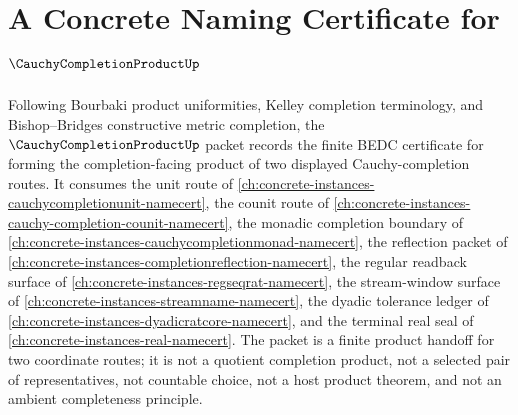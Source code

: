\chapter{A Concrete Naming Certificate for $\CauchyCompletionProductUp$}
\label{ch:concrete-instances-cauchy-completion-product-namecert}

Following Bourbaki product uniformities, Kelley completion terminology, and Bishop--Bridges constructive metric completion, the $\CauchyCompletionProductUp$ packet records the finite BEDC certificate for forming the completion-facing product of two displayed Cauchy-completion routes. It consumes the unit route of \autoref{ch:concrete-instances-cauchycompletionunit-namecert}, the counit route of \autoref{ch:concrete-instances-cauchy-completion-counit-namecert}, the monadic completion boundary of \autoref{ch:concrete-instances-cauchycompletionmonad-namecert}, the reflection packet of \autoref{ch:concrete-instances-completionreflection-namecert}, the regular readback surface of \autoref{ch:concrete-instances-regseqrat-namecert}, the stream-window surface of \autoref{ch:concrete-instances-streamname-namecert}, the dyadic tolerance ledger of \autoref{ch:concrete-instances-dyadicratcore-namecert}, and the terminal real seal of \autoref{ch:concrete-instances-real-namecert}. The packet is a finite product handoff for two coordinate routes; it is not a quotient completion product, not a selected pair of representatives, not countable choice, not a host product theorem, and not an ambient completeness principle.


